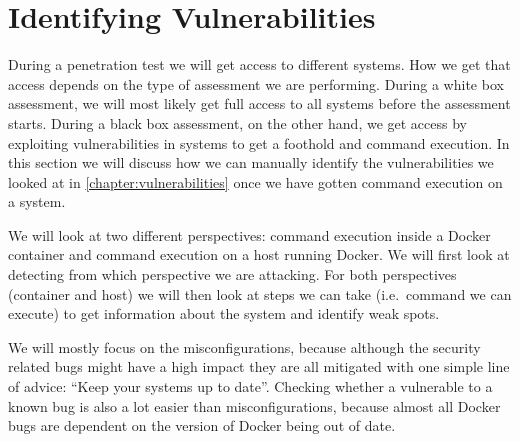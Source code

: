 \section{Identifying Vulnerabilities}
During a penetration test we will get access to different systems. How we get that access depends on the type of assessment we are performing. During a white box assessment, we will most likely get full access to all systems before the assessment starts. During a black box assessment, on the other hand, we get access by exploiting vulnerabilities in systems to get a foothold and command execution. In this section we will discuss how we can manually identify the vulnerabilities we looked at in \autoref{chapter:vulnerabilities} once we have gotten command execution on a system.

We will look at two different perspectives: command execution inside a Docker container and command execution on a host running Docker. We will first look at detecting from which perspective we are attacking. For both perspectives (container and host) we will then look at steps we can take (i.e.\ command we can execute) to get information about the system and identify weak spots.

\hfill

We will mostly focus on the misconfigurations, because although the security related bugs might have a high impact they are all mitigated with one simple line of advice: ``Keep your systems up to date''. Checking whether a vulnerable to a known bug is also a lot easier than misconfigurations, because almost all Docker bugs are dependent on the version of Docker being out of date.





